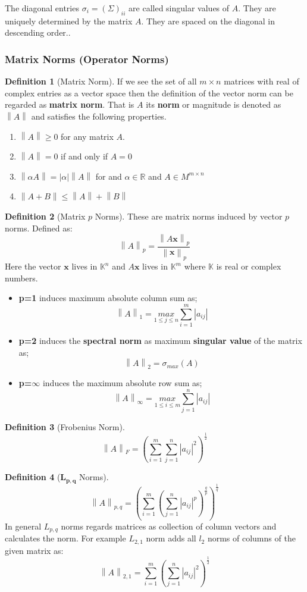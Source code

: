 \documentclass[11pt,a4paper]{article}
\theoremstyle{definition}
\newtheorem{definition}{Definition}[section]
\begin{document}
	The diagonal entries $\sigma_i = (\Sigma)_{ii}$ are called singular values of $A$. They are uniquely determined by the matrix $A$. They are spaced on the diagonal in descending order..
	\subsubsection{Matrix Norms (Operator Norms)}
	\begin{definition}[Matrix Norm]
		If we see the set of all $m \times n$ matrices with real of complex entries as a vector space then the definition of the vector norm can be regarded as \textbf{matrix norm}. That is $A$ its \textbf{norm} or magnitude is denoted as $\left\|A \right\|$ and satisfies the following properties.
		\begin{enumerate}
			\item $\left\|A \right\| \geq 0$ for any matrix $A$.
			\item $\left\|A \right\| = 0$ if and only if $A=0$
			\item $\left\| \alpha  A \right\| = |\alpha| \left\| A \right\|$ for and $\alpha \in \mathbb{R} $ and $A \in M^{m\times n} $
			\item $ \left\| A+B \right\| \leq \left\| A \right\| + \left\| B \right\| $
		\end{enumerate}
	\end{definition}
	\begin{definition}[Matrix $p$ Norms]
		These are matrix norms induced by vector $p$ norms. Defined as:
		$$ \left\|A \right\|_p = \frac{\left\|A \bm{x} \right\|_p}{\left\| \bm{x} \right\|_p} $$ 
		Here the vector $\bm{x}$ lives in $\mathbb{K}^n$ and $ A \bm{x}$ lives in $\mathbb{K}^m$ where $\mathbb{K}$ is real or complex numbers.
		\begin{itemize}
			\item \textbf{p=1} induces maximum absolute column sum as; $$\left\|A \right\|_1 = \underset{1 \leq j \leq n}{max} \sum_{i=1}^{m} |a_{ij}| $$
			\item \textbf{p=2} induces the \textbf{spectral norm} as maximum \textbf{singular value} of the matrix as;
			$$\left\|A \right\|_2 = \sigma_{max}(A)$$
			\item \textbf{p=$\infty$} induces the maximum absolute row sum as;
			$$ \left\|A \right\|_{\infty} = \underset{1 \leq i \leq m}{max} \sum_{j=1}^{n} |a_{ij}|  $$
		\end{itemize}
	\end{definition}
	\begin{definition}[Frobenius Norm]
		$$ \left\|A \right\|_F = \left( \sum_{i=1}^{m} \sum_{j=1}^{n} |a_{ij}|^2 \right)^{\frac{1}{2}} $$
	\end{definition}
	\begin{definition}[$\bm{L_{p,q}} $ Norms]

		$$ \left\|A \right\|_{p,q} = \left( \sum_{i=1}^{m} \left( \sum_{j=1}^{n} |a_{ij}|^p \right)^{\frac{q}{p}} \right)^{\frac{1}{q}} $$
		In general $L_{p,q}$ norms regards matrices as collection of column vectors and calculates the norm. For example $L_{2,1}$ norm adds all $l_2$ norms of columns of the given matrix as:
		$$ \left\|A \right\|_{2,1} =  \sum_{i=1}^{m} \left( \sum_{j=1}^{n} |a_{ij}|^2 \right)^{\frac{1}{2}} $$
	\end{definition}
\end{document}
